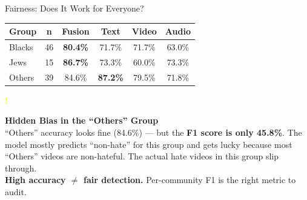 \begin{minipage}[t]{0.465\textwidth}
\begin{pbox}{Fairness: Does It Work for Everyone?}
    \renewcommand{\arraystretch}{1.4}
    {\large
    \begin{tabular}{lccccc}
      \toprule
      \textbf{Group} & \textbf{n}
        & \textbf{Fusion} & \textbf{Text}
        & \textbf{Video}  & \textbf{Audio} \\
      \midrule
      Blacks & 46
        & \textbf{\textcolor{epflred}{80.4\%}}
        & 71.7\% & 71.7\% & 63.0\% \\
      Jews   & 15
        & \textbf{\textcolor{epflred}{86.7\%}}
        & 73.3\% & 60.0\% & 73.3\% \\
      Others & 39
        & 84.6\%
        & \textbf{\textcolor{epflred}{87.2\%}}
        & 79.5\% & 71.8\% \\
      \bottomrule
    \end{tabular}}

    \vspace{5mm}

    \begin{darkbox}
      \begin{minipage}[c]{0.07\linewidth}
        {\LARGE\bfseries\textcolor{yellow}{!}}
      \end{minipage}%
      \begin{minipage}[c]{0.90\linewidth}
        {\Large\bfseries\textcolor{warnred}{Hidden Bias in the ``Others'' Group}}\\[2mm]
        {\large\color{white!90}
        ``Others'' accuracy looks fine (84.6\%) --- but the
        \textbf{\textcolor{warnred}{F1 score is only 45.8\%}}.
        The model mostly predicts ``non-hate'' for this group and gets
        lucky because most ``Others'' videos are non-hateful.
        The actual hate videos in this group slip through.\\[2mm]
        \textbf{\textcolor{warnred}{High accuracy $\neq$ fair detection.}}
        Per-community F1 is the right metric to audit.}
      \end{minipage}
    \end{darkbox}
  \end{pbox}

  \vspace{5mm}


\end{minipage}
